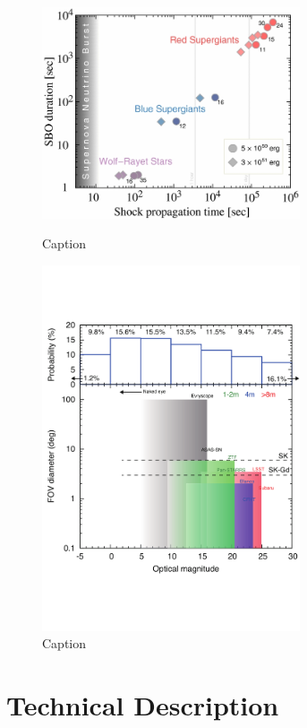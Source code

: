 \documentclass[12pt, letterpaper]{article}
\begin{document}
\begin{figure}
  \begin{center}
    \begin{minipage}[b]{3.1in}
      \includegraphics[width=3.0in]{apj487119f2_hr}
      \caption{Caption}
      \label{fig:delay-times}
    \end{minipage}
    \begin{minipage}[b]{3.1in}
      \includegraphics[width=3.0in]{fig9}
      \caption{Caption}
      \label{fig:multimessenger-comparison}
    \end{minipage}
  \end{center}
\end{figure}

\clearpage

\newpage
\section{Technical Description}
\end{document}
